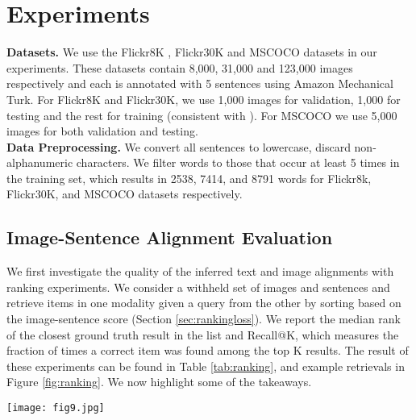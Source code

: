 \documentclass[10pt,twocolumn,letterpaper]{article}
\begin{document}
\vspace{-0.1in}
\section{Experiments}
\vspace{-0.15in}

\textbf{Datasets.} We use the Flickr8K \cite{hodosh2013framing}, Flickr30K \cite{flickr30k} and MSCOCO \cite{coco} datasets in our experiments. These datasets contain 8,000, 31,000 and 123,000 images respectively and each is annotated with 5 sentences using Amazon Mechanical Turk. For Flickr8K and Flickr30K, we use 1,000 images for validation, 1,000 for testing and the rest for training (consistent with \cite{hodosh2013framing,defrag}). For MSCOCO we use 5,000 images for both validation and testing. \\

\vspace{-0.2in}
\textbf{Data Preprocessing.} We convert all sentences to lowercase, discard non-alphanumeric characters. We filter words to those that occur at least 5 times in the training set, which results in 2538, 7414, and 8791 words for Flickr8k, Flickr30K, and MSCOCO datasets respectively.

\vspace{-0.1in}
\subsection{Image-Sentence Alignment Evaluation}
\vspace{-0.15in}
\label{sec:ranking}

We first investigate the quality of the inferred text and image alignments with ranking experiments. We consider a withheld set of images and sentences and retrieve items in one modality given a query from the other by sorting based on the image-sentence score  (Section \ref{sec:rankingloss}). We report the median rank of the closest ground truth result in the list and Recall@K, which measures the fraction of times a correct item was found among the top K results. The result of these experiments can be found in Table \ref{tab:ranking}, and example retrievals in Figure \ref{fig:ranking}. We now highlight some of the takeaways.

\begin{figure*}[t]
\texttt{[image: fig9.jpg]}
\caption{Example alignments predicted by our model. For every test image above, we retrieve the most compatible test sentence and visualize the highest-scoring region for each word (before MRF smoothing described in Section \ref{sec:mrf}) and the associated scores (). We hide the alignments of low-scoring words to reduce clutter. We assign each region an arbitrary color.}
\vspace{-0.1in}
\label{fig:ranking}
\end{figure*}
\end{document}
